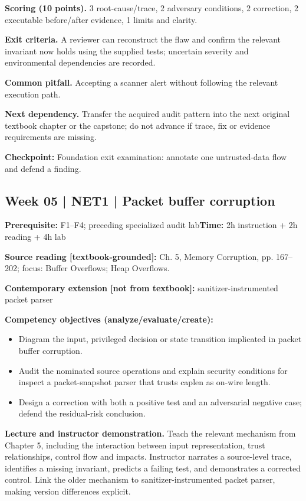 \documentclass[10pt,letterpaper]{article}
\begin{document}
\textbf{Scoring (10 points).} 3 root-cause/trace, 2 adversary conditions, 2 correction, 2 executable before/after evidence, 1 limits and clarity.

\textbf{Exit criteria.} A reviewer can reconstruct the flaw and confirm the relevant invariant now holds using the supplied tests; uncertain severity and environmental dependencies are recorded.

\textbf{Common pitfall.} Accepting a scanner alert without following the relevant execution path.

\textbf{Next dependency.} Transfer the acquired audit pattern into the next original textbook chapter or the capstone; do not advance if trace, fix or evidence requirements are missing.

\begin{historynote}\textbf{Checkpoint:} Foundation exit examination: annotate one untrusted-data flow and defend a finding.\end{historynote}
\subsection{Week 05 | NET1 | Packet buffer corruption}
\textbf{Prerequisite:} F1--F4; preceding specialized audit lab\hfill\textbf{Time:} 2h instruction + 2h reading + 4h lab

\textbf{Source reading [textbook-grounded]:} Ch. 5, Memory Corruption, pp. 167--202; focus: Buffer Overflows; Heap Overflows.

\textbf{Contemporary extension [not from textbook]:} sanitizer-instrumented packet parser

\textbf{Competency objectives (analyze/evaluate/create):}
\begin{itemize}[leftmargin=*,itemsep=2pt]
\item Diagram the input, privileged decision or state transition implicated in packet buffer corruption.
\item Audit the nominated source operations and explain security conditions for inspect a packet-snapshot parser that trusts caplen as on-wire length.
\item Design a correction with both a positive test and an adversarial negative case; defend the residual-risk conclusion.
\end{itemize}
\textbf{Lecture and instructor demonstration.} Teach the relevant mechanism from Chapter 5, including the interaction between input representation, trust relationships, control flow and impacts. Instructor narrates a source-level trace, identifies a missing invariant, predicts a failing test, and demonstrates a corrected control. Link the older mechanism to sanitizer-instrumented packet parser, making version differences explicit.
\end{document}
